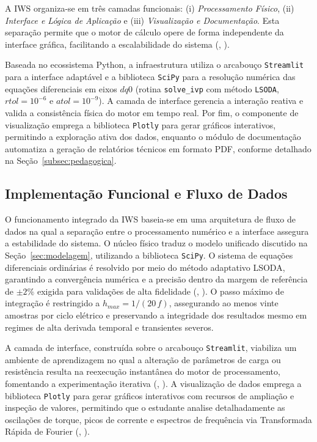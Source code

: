 \documentclass[a4paper]{ifacconf}
\begin{document}
A IWS organiza-se em três camadas funcionais: (i) \textit{Processamento Físico}, (ii) \textit{Interface e Lógica de Aplicação} e (iii) \textit{Visualização e Documentação}. Esta separação permite que o motor de cálculo opere de forma independente da interface gráfica, facilitando a escalabilidade do sistema (\citeauthor{aktaibi2011dynamic}, \citeyear{aktaibi2011dynamic}).

Baseada no ecossistema Python, a infraestrutura utiliza o arcabouço \texttt{Streamlit} para a interface adaptável e a biblioteca \texttt{SciPy} para a resolução numérica das equações diferenciais em eixos $dq0$ (rotina \texttt{solve\_ivp} com método \texttt{LSODA}, $rtol = 10^{-6}$ e $atol = 10^{-9}$). A camada de interface gerencia a interação reativa e valida a consistência física do motor em tempo real. Por fim, o componente de visualização emprega a biblioteca \texttt{Plotly} para gerar gráficos interativos, permitindo a exploração ativa dos dados, enquanto o módulo de documentação automatiza a geração de relatórios técnicos em formato PDF, conforme detalhado na Seção~\ref{subsec:pedagogica}.

\subsection{Implementação Funcional e Fluxo de Dados}

O funcionamento integrado da IWS baseia-se em uma arquitetura de fluxo de dados na qual a separação entre o processamento numérico e a interface assegura a estabilidade do sistema. O núcleo físico traduz o modelo unificado discutido na Seção~\ref{sec:modelagem}, utilizando a biblioteca \texttt{SciPy}. O sistema de equações diferenciais ordinárias é resolvido por meio do método adaptativo LSODA, garantindo a convergência numérica e a precisão dentro da margem de referência de $\pm 2\%$ exigida para validações de alta fidelidade (\citeauthor{li2010simulation}, \citeyear{li2010simulation}). O passo máximo de integração é restringido a $h_{max} = 1/(20\,f)$, assegurando ao menos vinte amostras por ciclo elétrico e preservando a integridade dos resultados mesmo em regimes de alta derivada temporal e transientes severos.

A camada de interface, construída sobre o arcabouço \texttt{Streamlit}, viabiliza um ambiente de aprendizagem no qual a alteração de parâmetros de carga ou resistência resulta na reexecução instantânea do motor de processamento, fomentando a experimentação iterativa (\citeauthor{tuanmohamad2024advance}, \citeyear{tuanmohamad2024advance}). A visualização de dados emprega a biblioteca \texttt{Plotly} para gerar gráficos interativos com recursos de ampliação e inspeção de valores, permitindo que o estudante analise detalhadamente as oscilações de torque, picos de corrente e espectros de frequência via Transformada Rápida de Fourier (\citeauthor{mohapatra2019steady}, \citeyear{mohapatra2019steady}).
\end{document}

